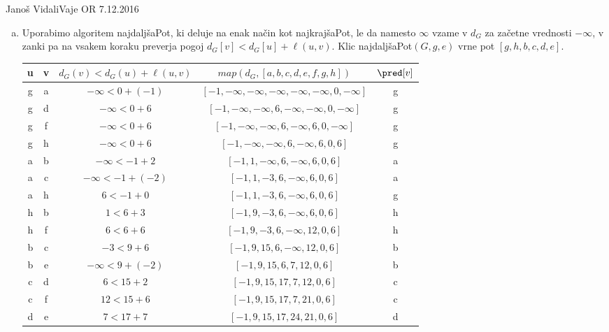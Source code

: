\begin{naloga}{Janoš Vidali}{Vaje OR 7.12.2016}
\begin{odgovor}
\begin{enumerate}[(a)]
\item Uporabimo algoritem {\sc najdaljšaPot},
ki deluje na enak način kot {\sc najkrajšaPot},
le da namesto $\infty$ vzame v $d_G$ za začetne vrednosti $-\infty$,
v zanki pa na vsakem koraku preverja pogoj $d_G[v] < d_G[u] + \ell(u, v)$.
Klic {\sc najdaljšaPot}$(G, g, e)$ vrne pot $[g, h, b, c, d, e]$.

\begin{tabela}
\begin{tabular}{c|c|c|c|c}
u & v & $d_G(v) < d_G(u) + \ell(u, v)$ & $map(d_G, [a, b, c, d, e, f, g, h])$ & $\pred[v]$ \\ \hline
g & a & $-\infty < 0 + (-1)$ & $[-1, -\infty, -\infty, -\infty, -\infty, -\infty, 0, -\infty]$ & g\\
g & d & $-\infty < 0 + 6$ & $[-1, -\infty, -\infty, 6, -\infty, -\infty, 0, -\infty]$ & g\\
g & f & $-\infty < 0 + 6$ & $[-1, -\infty, -\infty, 6, -\infty, 6, 0, -\infty]$ & g\\
g & h & $-\infty < 0 + 6$ & $[-1, -\infty, -\infty, 6, -\infty, 6, 0, 6]$ & g\\
a & b & $-\infty < -1 + 2$ & $[-1, 1, -\infty, 6, -\infty, 6, 0, 6]$ & a\\
a & c & $-\infty < -1 + (-2)$ & $[-1, 1, -3, 6, -\infty, 6, 0, 6]$ & a\\
a & h & $6 < -1 + 0$ & $[-1, 1, -3, 6, -\infty, 6, 0, 6]$ & g\\
h & b & $1 < 6 + 3$ & $[-1, 9, -3, 6, -\infty, 6, 0, 6]$ & h\\
h & f & $6 < 6 + 6$ & $[-1, 9, -3, 6, -\infty, 12, 0, 6]$ & h\\
b & c & $-3 < 9 + 6$ & $[-1, 9, 15, 6, -\infty, 12, 0, 6]$ & b\\
b & e & $-\infty < 9 + (-2)$ & $[-1, 9, 15, 6, 7, 12, 0, 6]$ & b\\
c & d & $6 < 15 + 2$ & $[-1, 9, 15, 17, 7, 12, 0, 6]$ & c\\
c & f & $12 < 15 + 6$ & $[-1, 9, 15, 17, 7, 21, 0, 6]$ & c\\
d & e & $7 < 17 + 7$ & $[-1, 9, 15, 17, 24, 21, 0, 6]$ & d\\
\end{tabular}
\end{tabela}

\end{enumerate}

\end{odgovor}
\end{naloga}

